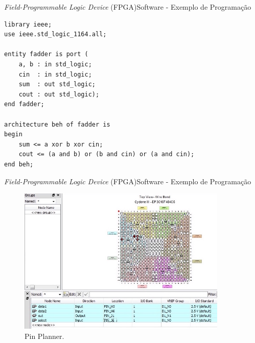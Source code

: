     	\begin{frame}[fragile]{\textit{Field-Programmable Logic Device} (FPGA)}{Software - Exemplo de Programação}
        \vspace{-1.1em}
        \begin{center}
            \begin{minipage}{10cm}
                \begin{verbatim}
library ieee;
use ieee.std_logic_1164.all;

entity fadder is port (
    a, b : in std_logic;
    cin  : in std_logic;
    sum  : out std_logic;
    cout : out std_logic);
end fadder;

architecture beh of fadder is 
begin
    sum <= a xor b xor cin;
    cout <= (a and b) or (b and cin) or (a and cin);
end beh;
                \end{verbatim}
            \end{minipage}
        \end{center}
    \end{frame}
    
    
    	\begin{frame}{\textit{Field-Programmable Logic Device} (FPGA)}{Software - Exemplo de Programação}
            \vspace{-1em}
    		\begin{figure}[p]
    			\centering
    			\includegraphics[width=0.89\textwidth]{img/fpga/software_quartus_pin.jpg}
                \vspace{-0.8em}
    			\caption{Pin Planner.}
    			\label{fig:alteraquartus_pinagem}
    		\end{figure}
    	\end{frame}
    
